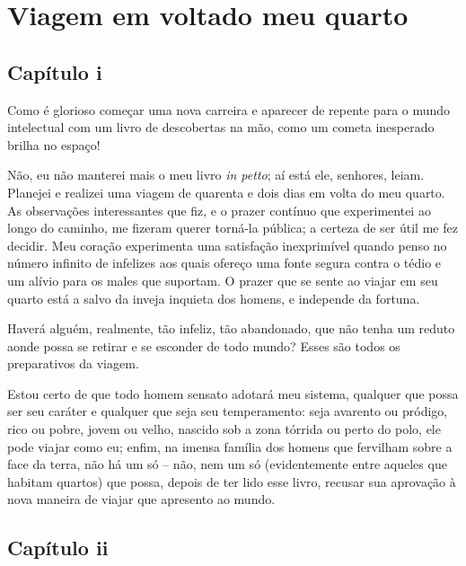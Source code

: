\chapter[Viagem em volta do meu quarto]{Viagem em volta\break do meu quarto}  


\section*{Capítulo i}

Como é glorioso começar uma nova carreira e aparecer de repente para o
mundo intelectual com um livro de descobertas na mão, como um cometa
inesperado brilha no espaço!

Não, eu não manterei mais o meu livro \textit{in petto}; aí está ele,
senhores, leiam. Planejei e realizei uma viagem de quarenta e dois dias
em volta do meu quarto. As observações interessantes que fiz, e o
prazer contínuo que experimentei ao longo do caminho, me fizeram querer
torná-la pública; a certeza de ser útil me fez decidir. Meu coração
experimenta uma satisfação inexprimível quando penso no número infinito
de infelizes aos quais ofereço uma fonte segura contra o tédio e um
alívio para os males que suportam. O prazer que se sente ao viajar em
seu quarto está a salvo da inveja inquieta dos homens, e independe da fortuna.

Haverá alguém, realmente, tão infeliz, tão abandonado, que não tenha um
reduto aonde possa se retirar e se esconder de todo mundo? Esses são
todos os preparativos da \mbox{viagem.}

Estou certo de que todo homem sensato adotará meu sistema, qualquer que
possa ser seu caráter e qualquer que seja seu temperamento: seja
avarento ou pródigo, rico ou pobre, jovem ou velho, nascido sob a zona
tórrida ou perto do polo, ele pode viajar como eu; enfim, na imensa
família dos homens que fervilham sobre a face da terra, não há um só
-- não, nem um só (evidentemente entre aqueles que habitam quartos)
que possa, depois de ter lido esse livro, recusar sua aprovação à nova
maneira de viajar que apresento ao mundo.

\section*{Capítulo ii}

